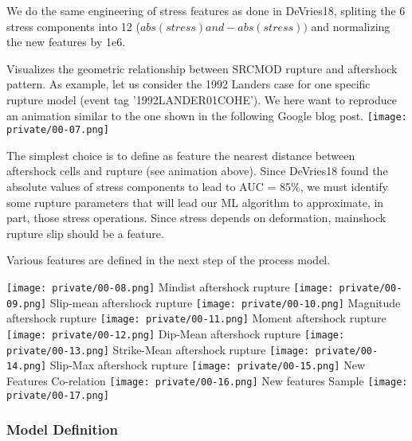 \documentclass[journal,transmag]{IEEEtran}
\begin{document}
We do the same engineering of stress features as done in DeVries18, spliting the 6 stress components into 12 ($abs(stress) and -abs(stress))$ and normalizing the new features by 1e6.

Visualizes the geometric relationship between SRCMOD rupture and aftershock pattern. As example, let us consider the 1992 Landers case for one specific rupture model (event tag '1992LANDER01COHE'). We here want to reproduce an animation similar to the one shown in the following Google blog post.
\texttt{[image: private/00-07.png]}

The simplest choice is to define as feature the nearest distance between aftershock cells and rupture (see animation above). Since DeVries18 found the absolute values of stress components to lead to AUC = 85\%, we must identify some rupture parameters that will lead our ML algorithm to approximate, in part, those stress operations. Since stress depends on deformation, mainshock rupture slip should be a feature.

Various features are defined in the next step of the process model.
\begin{center}
  \texttt{[image: private/00-08.png]}
  Mindist aftershock rupture
  \texttt{[image: private/00-09.png]}
  Slip-mean aftershock rupture
  \texttt{[image: private/00-10.png]}
  Magnitude aftershock rupture
  \texttt{[image: private/00-11.png]}
  Moment aftershock rupture
  \texttt{[image: private/00-12.png]}
  Dip-Mean aftershock rupture
  \texttt{[image: private/00-13.png]}
  Strike-Mean aftershock rupture
  \texttt{[image: private/00-14.png]}
  Slip-Max aftershock rupture
  \texttt{[image: private/00-15.png]}
  New Features Co-relation
  \texttt{[image: private/00-16.png]}
  New features Sample
  \texttt{[image: private/00-17.png]}
\end{center}

\vspace{0.5em}
\subsubsection{Model Definition}
\vspace{0.5em}
\end{document}

